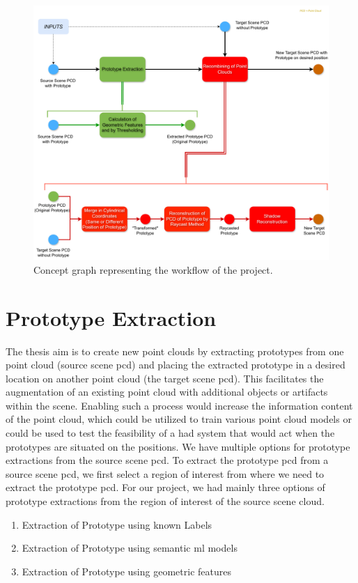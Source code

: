 \begin{figure}[htbp]
    \centering
    \includegraphics[width=1\linewidth]{97_graphics/concepts/graph_main.pdf}
    \caption{Concept graph representing the workflow of the project.}
    \label{fig:concept-graph}
\end{figure}



\section{Prototype Extraction}
The thesis aim is to create new point clouds by extracting prototypes from one point cloud (source scene \acrshort{pcd}) and placing the extracted prototype in a desired location on another point cloud (the target scene \acrshort{pcd}). This facilitates the augmentation of an existing point cloud with additional objects or artifacts within the scene. Enabling such a process would increase the information content of the point cloud, which could be utilized to train various point cloud models or could be used to test the feasibility of a \acrshort{had} system that would act when the prototypes are situated on the positions.
We have multiple options for prototype extractions from the source scene \acrshort{pcd}. To extract the prototype \acrshort{pcd} from a source scene \acrshort{pcd}, we first select a region of interest from where we need to extract the prototype \acrshort{pcd}. For our project, we had mainly three options of prototype extractions from the region of interest of the source scene cloud. 
\begin{enumerate}
    \item Extraction of Prototype using known Labels
    \item Extraction of Prototype using semantic \acrshort{ml} models
    \item Extraction of Prototype using geometric features
\end{enumerate}

